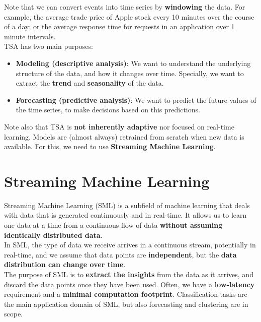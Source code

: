 Note that we can convert events into time series by \textbf{windowing} the data.
For example, the average trade price of Apple stock every 10 minutes over the
course of a day; or the average response time for requests in an application over 1
minute intervals.\\

TSA has two main purposes:
\begin{itemize}
    \item \textbf{Modeling (descriptive analysis)}: We want to understand the underlying
    structure of the data, and how it changes over time. Specially, we want to extract 
    the \textbf{trend} and \textbf{seasonality} of the data.

    \item \textbf{Forecasting (predictive analysis)}: We want to predict the future 
    values of the time series, to make decisions based on this predictions.

\end{itemize}

Note also that TSA is \textbf{not inherently adaptive} nor focused on real-time 
learning. Models are (almost always) retrained from scratch when new data is available.
For this, we need to use \textbf{Streaming Machine Learning}.

\section{Streaming Machine Learning}

Streaming Machine Learning (SML) is a subfield of machine learning that deals with
data that is generated continuously and in real-time. It allows us to learn one data at
a time from a continuous flow of data \textbf{without assuming identically
distributed data}.\\

In SML, the type of data we receive arrives in a continuous stream, potentially in 
real-time, and we assume that data points are \textbf{independent}, but the \textbf{data
distribution can change over time}.\\

The purpose of SML is to \textbf{extract the insights} from the data as it arrives, and
discard the data points once they have been used. Often, we have a \textbf{low-latency}
requirement and a \textbf{minimal computation footprint}. Classification tasks are the main
application domain of SML, but also forecasting and clustering are in scope.\\

